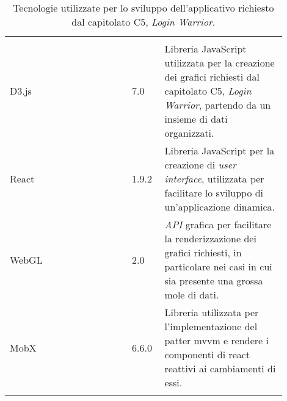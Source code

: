 {\begin{longtable}{>{\raggedright\arraybackslash}m{0.40\linewidth}m{0.10\linewidth}m{0.40\linewidth}}
    \rowcolor[RGB]{47, 106, 73}
    \multicolumn{3}{>{\centering\arraybackslash}m{0.953\linewidth}}{\textcolor{white}{\textbf{Librerie e Framework}}}\\ 

    \rowcolor[RGB]{216, 235, 171}
    D3.js & 7.0 & Libreria JavaScript utilizzata per la creazione dei grafici richiesti dal capitolato C5, \textit{Login Warrior}, partendo da un insieme di dati organizzati.\\

    \rowcolor[RGB]{233, 245, 206}
    React & 1.9.2 & Libreria JavaScript per la creazione di \textit{user interface}, utilizzata per facilitare lo sviluppo di un'applicazione dinamica.\\

    \rowcolor[RGB]{216, 235, 171}
    WebGL & 2.0 & \textit{API} grafica per facilitare la renderizzazione dei grafici richiesti, in particolare nei casi in cui sia presente una grossa mole di dati.\\

    \rowcolor[RGB]{233, 245, 206}
    MobX & 6.6.0 & Libreria utilizzata per l'implementazione del patter mvvm e
    rendere i componenti di react reattivi ai cambiamenti di essi.\\

    \caption{Tecnologie utilizzate per lo sviluppo dell'applicativo richiesto dal capitolato C5, \textit{Login Warrior}.}
\end{longtable}
}


